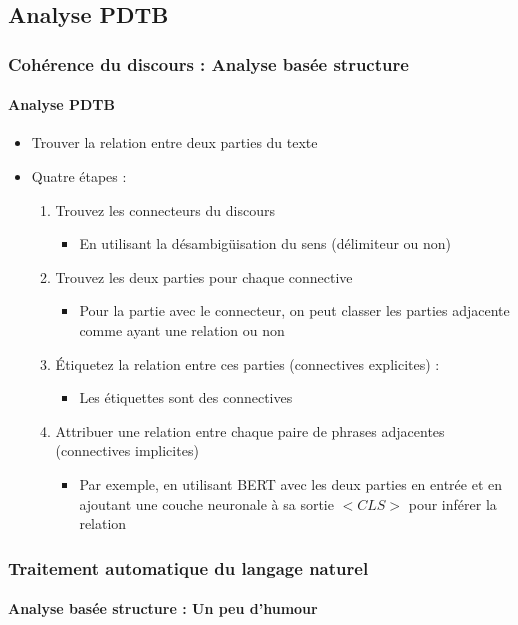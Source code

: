 \documentclass[xcolor=table]{beamer}
\begin{document}
\subsection{Analyse PDTB}

\begin{frame}
	\frametitle{Cohérence du discours : Analyse basée structure}
	\framesubtitle{Analyse PDTB}
	
	\begin{itemize}
		\item Trouver la relation entre deux parties du texte
		\item Quatre étapes : 
		\begin{enumerate}
			\item Trouvez les connecteurs du discours
			\begin{itemize}
				\item En utilisant la désambigüisation du sens (délimiteur ou non)
			\end{itemize}
			\item Trouvez les deux parties pour chaque connective
			\begin{itemize}
				\item Pour la partie avec le connecteur, on peut classer les parties adjacente comme ayant une relation ou non
			\end{itemize}
			\item Étiquetez la relation entre ces parties (connectives explicites) : 
			\begin{itemize}
				\item Les étiquettes sont des connectives
			\end{itemize}
			\item Attribuer une relation entre chaque paire de phrases adjacentes (connectives implicites)
			\begin{itemize}
				\item Par exemple, en utilisant BERT avec les deux parties en entrée et en ajoutant une couche neuronale à sa sortie $ <CLS> $ pour inférer la relation
			\end{itemize}
		\end{enumerate}
	\end{itemize}
	
\end{frame}

\begin{frame}
	\frametitle{Traitement automatique du langage naturel}
	\framesubtitle{Analyse basée structure :  Un peu d'humour}
	
	\begin{center}
	\end{center}
	
\end{frame}
\end{document}
